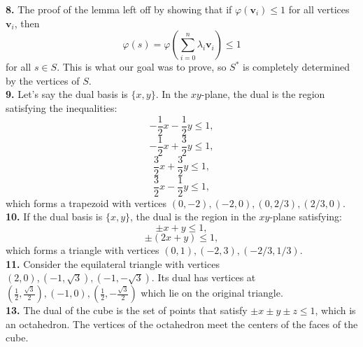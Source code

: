 \documentclass{article}
\newcommand{\bv}{\mathbf{v}}
\begin{document}
\textbf{8.} The proof of the lemma left off by showing that if $\varphi(\bv_i) \le 1$ for all vertices $\bv_i$, then $$\varphi(s) = \varphi\left(\sum_{i = 0}^n \lambda_i \bv_i \right) \le 1$$ for all $s \in S$. This is what our goal was to prove, so $S^*$ is completely determined by the vertices of $S$. \\

\textbf{9.} Let's say the dual basis is $\{x, y\}$. In the $xy$-plane, the dual is the region satisfying the inequalities:
$$-\frac{1}{2}x-\frac{1}{2}y\le1,$$
$$-\frac{1}{2}x+\frac{3}{2}y\le1,$$
$$\frac{3}{2}x+\frac{3}{2}y\le1,$$
$$\frac{3}{2}x-\frac{1}{2}y\le1,$$
which forms a trapezoid with vertices $(0, -2), (-2, 0), (0, 2/3), (2/3, 0)$. \\

\textbf{10.} If the dual basis is $\{x, y\}$, the dual is the region in the $xy$-plane satisfying:
$$\pm x + y \le 1,$$
$$\pm(2x + y) \le 1,$$
which forms a triangle with vertices $(0, 1), (-2, 3), (-2/3, 1/3)$. \\

\textbf{11.} Consider the equilateral triangle with vertices $(2, 0), (-1, \sqrt{3}), (-1, -\sqrt{3})$. Its dual has vertices at $\left(\frac{1}{2}, \frac{\sqrt{3}}{2}\right), (-1, 0), \left(\frac{1}{2}, -\frac{\sqrt{3}}{2}\right)$ which lie on the original triangle. \\

\textbf{13.} The dual of the cube is the set of points that satisfy $\pm x \pm y \pm z \le 1$, which is an octahedron. The vertices of the octahedron meet the centers of the faces of the cube.
\end{document}
